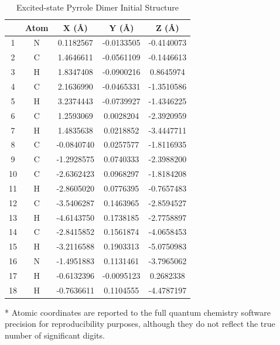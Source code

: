 \begin{table}[hbt!]\centering
\caption{Excited-state Pyrrole Dimer Initial Structure}
\renewcommand{\arraystretch}{1.5}
\begin{threeparttable}
\begin{tabular}{ccccc}\toprule
{} & {Atom} & {X (\AA)} & {Y (\AA)} & {Z (\AA)} \\ \midrule
    1  & N &  0.1182567 & -0.0133505 & -0.4140073\\
    2  & C &  1.4646611 & -0.0561109 & -0.1446613\\
    3  & H &  1.8347408 & -0.0900216 &  0.8645974\\
    4  & C &  2.1636990 & -0.0465331 & -1.3510586\\
    5  & H &  3.2374443 & -0.0739927 & -1.4346225\\
    6  & C &  1.2593069 &  0.0028204 & -2.3920959\\
    7  & H &  1.4835638 &  0.0218852 & -3.4447711\\
    8  & C & -0.0840740 &  0.0257577 & -1.8116935\\
    9  & C & -1.2928575 &  0.0740333 & -2.3988200\\
    10 & C & -2.6362423 &  0.0968297 & -1.8184208\\
    11 & H & -2.8605020 &  0.0776395 & -0.7657483\\
    12 & C & -3.5406287 &  0.1463965 & -2.8594527\\
    13 & H & -4.6143750 &  0.1738185 & -2.7758897\\
    14 & C & -2.8415852 &  0.1561874 & -4.0658453\\
    15 & H & -3.2116588 &  0.1903313 & -5.0750983\\
    16 & N & -1.4951883 &  0.1131461 & -3.7965062\\
    17 & H & -0.6132396 & -0.0095123 &  0.2682338\\
    18 & H & -0.7636611 &  0.1104555 & -4.4787197\\ \bottomrule
\end{tabular}
\begin{tablenotes}
\item[*] \footnotesize Atomic coordinates are reported to the full quantum chemistry software precision for reproducibility purposes, although they do not reflect the true number of significant digits.
\end{tablenotes}
\end{threeparttable}
\end{table}

